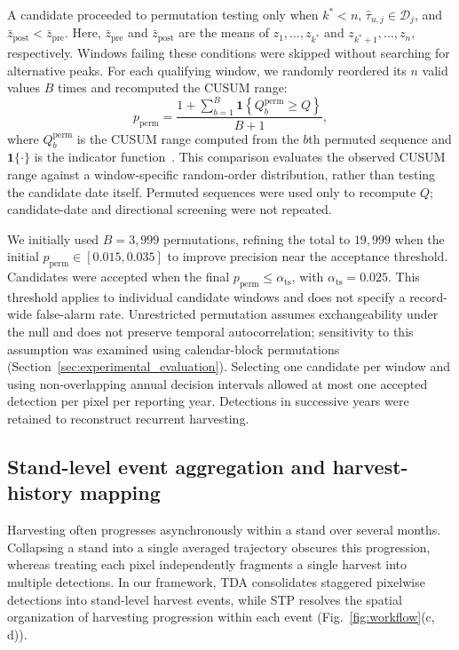 A candidate proceeded to permutation testing only when $k^*<n$, $\hat{\tau}_{u,j}\in\mathcal{D}_j$, and $\bar z_{\mathrm{post}}<\bar z_{\mathrm{pre}}$. Here, $\bar z_{\mathrm{pre}}$ and $\bar z_{\mathrm{post}}$ are the means of $z_1,\ldots,z_{k^*}$ and $z_{k^*+1},\ldots,z_n$, respectively. Windows failing these conditions were skipped without searching for alternative peaks. For each qualifying window, we randomly reordered its $n$ valid values $B$ times and recomputed the CUSUM range:
\begin{equation}
    p_{\mathrm{perm}}
    =
    \frac{
        1+\sum_{b=1}^{B}
        \mathbf{1}\!\left\{
            Q_b^{\mathrm{perm}}\geq Q
        \right\}
    }{B+1},
    \label{eq:permutation_pvalue}
\end{equation}
where $Q_b^{\mathrm{perm}}$ is the CUSUM range computed from the $b$th permuted sequence and $\mathbf{1}\{\cdot\}$ is the indicator function~\citep{PhipsonSmyth2010Permutation}. This comparison evaluates the observed CUSUM range against a window-specific random-order distribution, rather than testing the candidate date itself. Permuted sequences were used only to recompute $Q$; candidate-date and directional screening were not repeated.

We initially used $B=3{,}999$ permutations, refining the total to $19{,}999$ when the initial $p_{\mathrm{perm}}\in[0.015,0.035]$ to improve precision near the acceptance threshold. Candidates were accepted when the final $p_{\mathrm{perm}}\leq\alpha_{\mathrm{ts}}$, with $\alpha_{\mathrm{ts}}=0.025$. This threshold applies to individual candidate windows and does not specify a record-wide false-alarm rate. Unrestricted permutation assumes exchangeability under the null and does not preserve temporal autocorrelation; sensitivity to this assumption was examined using calendar-block permutations (Section~\ref{sec:experimental_evaluation}). Selecting one candidate per window and using non-overlapping annual decision intervals allowed at most one accepted detection per pixel per reporting year. Detections in successive years were retained to reconstruct recurrent harvesting.

\subsection{Stand-level event aggregation and harvest-history mapping}
\label{sec:stand_history_reconstruction}

Harvesting often progresses asynchronously within a stand over several months. Collapsing a stand into a single averaged trajectory obscures this progression, whereas treating each pixel independently fragments a single harvest into multiple detections. In our framework, TDA consolidates staggered pixelwise detections into stand-level harvest events, while STP resolves the spatial organization of harvesting progression within each event (Fig.~\ref{fig:workflow}(c, d)).

